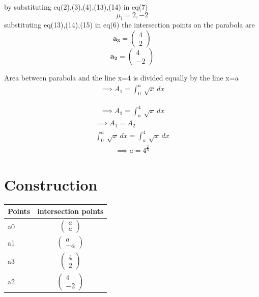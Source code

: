 \documentclass[journal,10pt,twocolumn]{article}
\let\vec\mathbf
\newcommand{\myvec}[1]{\ensuremath{\begin{pmatrix}#1\end{pmatrix}}}
\begin{document}
by substituting eq(2),(3),(4),(13),(14) in eq(7)
\begin{equation}
\mu_i=2,-2
\end{equation}
substituting eq(13),(14),(15) in eq(6) the intersection points on the parabola are
\begin{equation}
\vec{a_3}=\myvec{4\\2}
\end{equation}
\begin{equation}
\vec{a_2}=\myvec{4\\-2}
\end{equation}

Area between parabola and the line x=4 is divided equally by the line x=a
\begin{align}
\implies A_1=\int_{0}^{a} \ \sqrt{x} \,dx
\end{align}

\begin{align}
\implies A_2=\int_{a}^{4} \ \sqrt{x} \,dx
\end{align}
\begin{align}
\implies A_1=A_2 \\
\int_{0}^{a} \ \sqrt{x} \,dx=\int_{a}^{4} \ \sqrt{x} \,dx
\end{align}
\begin{align}
\implies a=4^\frac{2}{3}
\end{align}


\section*{\large Construction}

{
\setlength\extrarowheight{5pt}
\begin{tabular}{|l|c|}
    \hline 
    \textbf{Points} & \textbf{intersection points} \\ \hline
   a0 & $\myvec{
   a\\
   a
   } $ \\\hline
   a1 & $\myvec{
   a\\
   -a
   } $ \\\hline
    
   a3 & $\myvec{
   4\\
   2
   } $ \\\hline
   a2 & $\myvec{
   4\\
   -2
   } $ \\\hline
      
      \end{tabular}
}
\end{document}
